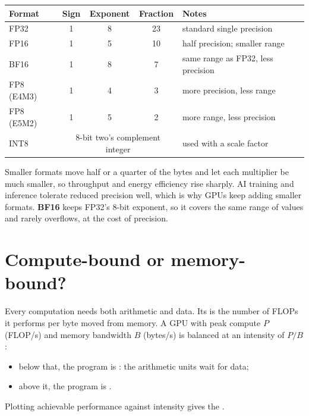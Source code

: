 \begin{center}
\begin{tabular}{lcccl}
\toprule
Format & Sign & Exponent & Fraction & Notes \\
\midrule
FP32 & 1 & 8 & 23 & standard single precision \\
FP16 & 1 & 5 & 10 & half precision; smaller range \\
BF16 & 1 & 8 & 7 & same range as FP32, less precision \\
FP8 (E4M3) & 1 & 4 & 3 & more precision, less range \\
FP8 (E5M2) & 1 & 5 & 2 & more range, less precision \\
INT8 & \multicolumn{3}{c}{8-bit two's complement integer} & used with a scale factor \\
\bottomrule
\end{tabular}
\end{center}

Smaller formats move half or a quarter of the bytes and let each multiplier be much smaller, so throughput and energy efficiency rise sharply. AI training and inference tolerate reduced precision well, which is why GPUs keep adding smaller formats. \textbf{BF16} keeps FP32's 8-bit exponent, so it covers the same range of values and rarely overflows, at the cost of precision.

\section{Compute-bound or memory-bound?}

Every computation needs both arithmetic and data. Its  is the number of FLOPs it performs per byte moved from memory. A GPU with peak compute $P$ (FLOP/s) and memory bandwidth $B$ (bytes/s) is balanced at an intensity of $P/B$:
\begin{itemize}
  \item below that, the program is : the arithmetic units wait for data;
  \item above it, the program is .
\end{itemize}
Plotting achievable performance against intensity gives the .

